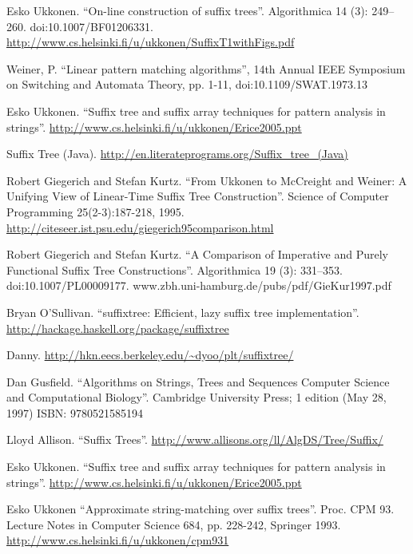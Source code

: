 \begin{thebibliography}{99}

Esko Ukkonen. ``On-line construction of suffix trees''. Algorithmica 14 (3): 249--260. doi:10.1007/BF01206331. \url{http://www.cs.helsinki.fi/u/ukkonen/SuffixT1withFigs.pdf}

Weiner, P. ``Linear pattern matching algorithms'', 14th Annual IEEE Symposium on Switching and Automata Theory, pp. 1-11, doi:10.1109/SWAT.1973.13

Esko Ukkonen. ``Suffix tree and suffix array techniques for pattern analysis in strings''. \url{http://www.cs.helsinki.fi/u/ukkonen/Erice2005.ppt}

Suffix Tree (Java). \url{http://en.literateprograms.org/Suffix_tree_(Java)}

Robert Giegerich and Stefan Kurtz. ``From Ukkonen to McCreight and Weiner: A Unifying View of Linear-Time Suffix Tree Construction''. Science of Computer Programming 25(2-3):187-218, 1995. \url{http://citeseer.ist.psu.edu/giegerich95comparison.html}

Robert Giegerich and Stefan Kurtz. ``A Comparison of Imperative and Purely Functional Suffix Tree Constructions''. Algorithmica 19 (3): 331--353. doi:10.1007/PL00009177. www.zbh.uni-hamburg.de/pubs/pdf/GieKur1997.pdf

Bryan O'Sullivan. ``suffixtree: Efficient, lazy suffix tree implementation''. \url{http://hackage.haskell.org/package/suffixtree}

Danny. \url{http://hkn.eecs.berkeley.edu/~dyoo/plt/suffixtree/}

Dan Gusfield. ``Algorithms on Strings, Trees and Sequences Computer Science and Computational Biology''. Cambridge University Press; 1 edition (May 28, 1997) ISBN: 9780521585194

Lloyd Allison. ``Suffix Trees''. \url{http://www.allisons.org/ll/AlgDS/Tree/Suffix/}

Esko Ukkonen. ``Suffix tree and suffix array techniques for pattern analysis in strings''. \url{http://www.cs.helsinki.fi/u/ukkonen/Erice2005.ppt}

Esko Ukkonen ``Approximate string-matching over suffix trees''. Proc. CPM 93. Lecture Notes in Computer Science 684, pp. 228-242, Springer 1993. \url{http://www.cs.helsinki.fi/u/ukkonen/cpm931}


\end{thebibliography}
